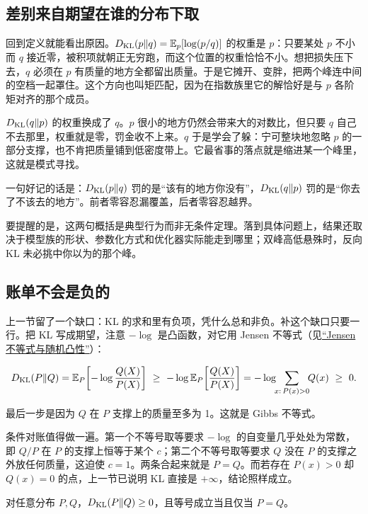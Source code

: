 \subsection{差别来自期望在谁的分布下取}

回到定义就能看出原因。\(D_{\mathrm{KL}}(p\|q)=\mathbb{E}_p[\log(p/q)]\) 的权重是 \(p\)：只要某处 \(p\) 不小而 \(q\) 接近零，被积项就朝正无穷跑，而这个位置的权重恰恰不小。想把损失压下去，\(q\) 必须在 \(p\) 有质量的地方全都留出质量。于是它摊开、变胖，把两个峰连中间的空档一起罩住。这个方向也叫矩匹配，因为在指数族里它的解恰好是与 \(p\) 各阶矩对齐的那个成员。

\(D_{\mathrm{KL}}(q\|p)\) 的权重换成了 \(q\)。\(p\) 很小的地方仍然会带来大的对数比，但只要 \(q\) 自己不去那里，权重就是零，罚金收不上来。\(q\) 于是学会了躲：宁可整块地忽略 \(p\) 的一部分支撑，也不肯把质量铺到低密度带上。它最省事的落点就是缩进某一个峰里，这就是模式寻找。

一句好记的话是：\(D_{\mathrm{KL}}(p\|q)\) 罚的是``该有的地方你没有''，\(D_{\mathrm{KL}}(q\|p)\) 罚的是``你去了不该去的地方''。前者零容忍漏覆盖，后者零容忍越界。

要提醒的是，这两句概括是典型行为而非无条件定理。落到具体问题上，结果还取决于模型族的形状、参数化方式和优化器实际能走到哪里；双峰高低悬殊时，反向 KL 未必挑中你以为的那个峰。

\subsection{账单不会是负的}

上一节留了一个缺口：KL 的求和里有负项，凭什么总和非负。补这个缺口只要一行。把 KL 写成期望，注意 \(-\log\) 是凸函数，对它用 Jensen 不等式（见\hyperref[sec:05-Probability/07-Transforms-and-Bounds/03]{``Jensen 不等式与随机凸性''}）：

\[
D_{\mathrm{KL}}(P \| Q) = \mathbb{E}_P\!\left[-\log \frac{Q(X)}{P(X)}\right]
\ \ge\ -\log \mathbb{E}_P\!\left[\frac{Q(X)}{P(X)}\right]
= -\log\!\!\sum_{x:\,P(x)>0}\!\! Q(x) \ \ge\ 0.
\]

最后一步是因为 \(Q\) 在 \(P\) 支撑上的质量至多为 1。这就是 Gibbs 不等式。

条件对账值得做一遍。第一个不等号取等要求 \(-\log\) 的自变量几乎处处为常数，即 \(Q/P\) 在 \(P\) 的支撑上恒等于某个 \(c\)；第二个不等号取等要求 \(Q\) 没在 \(P\) 的支撑之外放任何质量，这迫使 \(c=1\)。两条合起来就是 \(P=Q\)。而若存在 \(P(x)>0\) 却 \(Q(x)=0\) 的点，上一节已说明 KL 直接是 \(+\infty\)，结论照样成立。

\begin{theorem}
对任意分布 \(P,Q\)，\(D_{\mathrm{KL}}(P\|Q)\ge 0\)，且等号成立当且仅当 \(P=Q\)。
\end{theorem}

